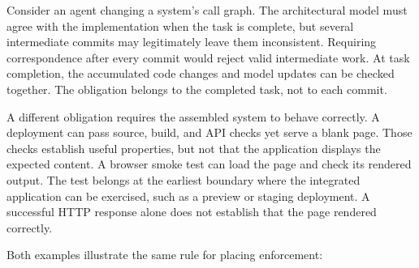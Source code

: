 

Consider an agent changing a system's call graph. The architectural model must agree with the implementation when the task is complete, but several intermediate commits may legitimately leave them inconsistent. Requiring correspondence after every commit would reject valid intermediate work. At task completion, the accumulated code changes and model updates can be checked together. The obligation belongs to the completed task, not to each commit.


A different obligation requires the assembled system to behave correctly. A deployment can pass source, build, and API checks yet serve a blank page. Those checks establish useful properties, but not that the application displays the expected content. A browser smoke test can load the page and check its rendered output. The test belongs at the earliest boundary where the integrated application can be exercised, such as a preview or staging deployment. A successful HTTP response alone does not establish that the page rendered correctly.






Both examples illustrate the same rule for placing enforcement:

